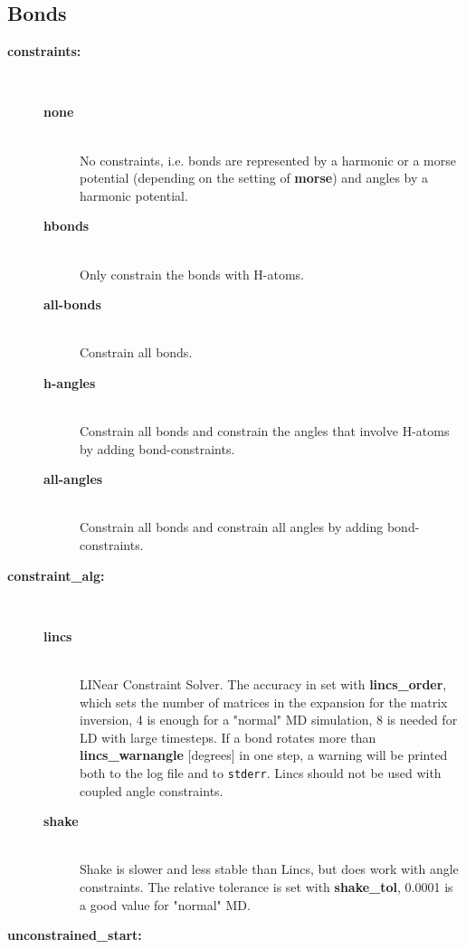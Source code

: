 \subsection{Bonds}
\begin{description}
\item[{\bf constraints:}]\mbox{}\\
\vspace{-2ex}\begin{description}
\item[{\bf none}]\mbox{}\\
No constraints, i.e. bonds are represented by a harmonic or a
morse potential (depending on the setting of {\bf morse}) and angles
by a harmonic potential.
\item[{\bf hbonds}]\mbox{}\\
Only constrain the bonds with H-atoms.
\item[{\bf all-bonds}]\mbox{}\\
Constrain all bonds.
\item[{\bf h-angles}]\mbox{}\\
Constrain all bonds and constrain the angles that involve H-atoms
by adding bond-constraints.
\item[{\bf all-angles}]\mbox{}\\
Constrain all bonds and constrain all angles by adding bond-constraints.
\end{description}
\item[{\bf constraint\_alg:}]\mbox{}\\
\vspace{-2ex}\begin{description}
\item[{\bf lincs}]\mbox{}\\
LINear Constraint Solver. The accuracy in set with
{\bf lincs\_order}, which sets the number of matrices in the expansion
for the matrix inversion, 4 is enough for a "normal" MD simulation, 8 is
needed for LD with large timesteps. If a bond rotates more than
{\bf lincs\_warnangle} [degrees] in one step, 
a warning will be printed both to the log file and to {\tt stderr}. 
Lincs should not be used with coupled angle constraints.
\item[{\bf shake}]\mbox{}\\
Shake is slower and less stable than Lincs, but does work with 
angle constraints. 
The relative tolerance is set with {\bf shake\_tol}, 0.0001 is a good value
for "normal" MD. 
\end{description}
\item[{\bf unconstrained\_start:}]\mbox{}\\

\end{description}
